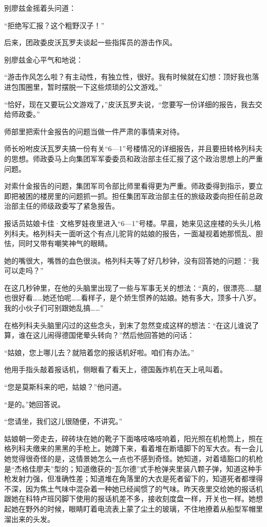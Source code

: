 别廖兹金摇着头问道：

“拒绝写汇报？这个粗野汉子！”

后来，团政委皮沃瓦罗夫谈起一些指挥员的游击作风。

别廖兹金心平气和地说：

“游击作风怎么啦？有主动性，有独立性，很好。我有时候就在幻想：顶好我也落进包围圈里，暂时摆脱一下这些烦琐的公文游戏。”

“恰好，现在又要玩公文游戏了，”皮沃瓦罗夫说，“您要写一份详细的报告，我去交给师政委。”

师部里把索什金报告的问题当做一件严肃的事情来对待。

师长吩咐皮沃瓦罗夫搞一份有关“6—1”号楼情况的详细报告，并且要扭转格列科夫的思想。师政委马上向集团军军委委员和政治部主任汇报了这个政治思想上的严重问题。

对索什金报告的问题，集团军司令部比师里看得更为严重。师政委得到指示，要立即把被困的楼房里的问题抓一抓。担任集团军政治部主任的旅级政委向担任前总政治部主任的师级政委写了紧急报告。

报话员姑娘卡佳·文格罗娃夜里进入“6—1”号楼。早晨，她来见这座楼的头头儿格列科夫。格列科夫一面听这个有点儿驼背的姑娘的报告，一面凝视着她那慌乱、胆怯，同时又带有嘲笑神气的眼睛。

她的嘴很大，嘴唇的血色很淡。格列科夫等了好几秒钟，没有回答她的问题：“我可以走吗？”

在这几秒钟里，在他的头脑里出现了一些与军事无关的想法：“真的，很漂亮……腿也很好看……她还怕呢……看样子，是个娇生惯养的姑娘。她有多大，顶多十八岁。我的小伙子们可别跟她乱搞……”

在格列科夫头脑里闪过的这些念头，到末了忽然变成这样的想法：“在这儿谁说了算，谁在这儿闹得德国佬晕头转向？”然后他回答她的问话：

“姑娘，您上哪儿去？就陪着您的报话机好啦。咱们有办法。”

他用手指头敲着报话机，侧眼看了看天上，德国轰炸机在天上吼叫着。

“您是莫斯科来的吧，姑娘？”他问道。

“是的。”她回答说。

“您请坐，我们这儿很随便，不讲究。”

姑娘朝一旁走去，碎砖块在她的靴子下面咯吱咯吱响着，阳光照在机枪筒上，照在格列科夫缴来的黑黑的手枪上。她蹲下来，看着堆在断墙脚下的军大衣。有一会儿她觉得很奇怪的是，这情景她怎么一点也不感到奇怪。她知道，对着墙豁口的机枪是“杰格佳廖夫”型的；知道缴获的“瓦尔德”式手枪弹夹里装八颗子弹，知道这种手枪发射力强，但准确性差；知道堆在角落里的大衣是死者留下的，知道死者都埋得不深，因为焦土气味中混杂着一种她已经闻惯了的气味。昨天夜里交给她的报话机跟她在科特卢班冈脚下使用的报话机差不多，接收刻度盘一样，开关也一样。她想起她在野外的时候，眼睛盯着电流表上蒙了尘土的玻璃，不住地撩着从船型军帽里溜出来的头发。

